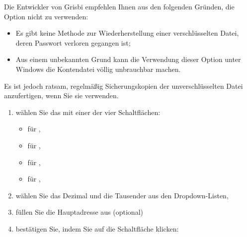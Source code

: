 \begin{enumerate}
\minisec{\Attention{}}
Die Entwickler von Grisbi empfehlen Ihnen aus den folgenden Gründen, die Option  nicht zu verwenden:%
\begin{itemize}
	\item Es gibt keine Methode zur Wiederherstellung einer verschlüsselten Datei, deren Passwort verloren gegangen ist;%
	\item Aus einem unbekannten Grund kann die Verwendung dieser Option unter \gls{Windows} die Kontendatei völlig unbrauchbar machen.%
\end{itemize}  
Es ist jedoch ratsam, regelmäßig Sicherungskopien der unverschlüsselten Datei anzufertigen, wenn Sie sie verwenden.%

		\begin{enumerate}[resume]		%
			\item wählen Sie das  mit einer der vier Schaltflächen:%
				\begin{itemize}	
				\item[\textopenbullet]  für ,
				\item[\textopenbullet]  für ,
				\item[\textopenbullet]  für ,
				\item[\textopenbullet]  für ,
				\end{itemize}
			\item wählen Sie das Dezimal  und die Tausender aus den Dropdown-Listen,%
			\item füllen Sie die Hauptadresse aus (optional)%
			\item bestätigen Sie, indem Sie auf die Schaltfläche  klicken:%
		\end{enumerate}


\end{enumerate}
